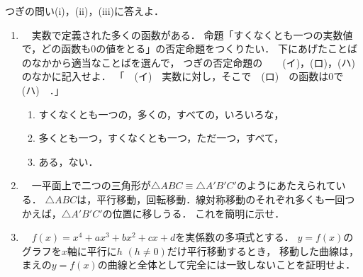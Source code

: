 \documentclass[../../main.tex]{subfiles}
\begin{document}
つぎの問い(i)，(ii)，(iii)に答えよ．
\begin{enumerate}
  \item[(i)] 　実数で定義された多くの函数がある．
    命題「すくなくとも一つの実数値で，どの函数も0の値をとる」の否定命題をつくりたい．
    下にあげたことばのなかから適当なことばを選んで，
    つぎの否定命題の　　(イ)，(ロ)，(ハ)のなかに記入せよ．
    「　(イ)　実数に対し，そこで　(ロ)　の函数は0で　(ハ)　．」
    \begin{enumerate}
      \item[(イ)] すくなくとも一つの，多くの，すべての，いろいろな，
      \item[(ロ)] 多くとも一つ，すくなくとも一つ，ただ一つ，すべて，
      \item[(ハ)] ある，ない．
    \end{enumerate}
  \item[(ii)] 　一平面上で二つの三角形が$\triangle ABC \equiv \triangle A'B'C'$のようにあたえられている．
    $\triangle ABC$は，平行移動，回転移動．線対称移動のそれぞれ多くも一回つかえば，$\triangle A'B'C'$の位置に移しうる．
    これを簡明に示せ．
  \item[(iii)] 　$f(x)=x^4+ax^3+bx^2+cx+d$を実係数の多項式とする．
    $y=f(x)$のグラフを$x$軸に平行に$h$ $(h \neq 0)$だけ平行移動するとき，
    移動した曲線は，まえの$y=f(x)$の曲線と全体として完全には一致しないことを証明せよ．
\end{enumerate}
\end{document}
